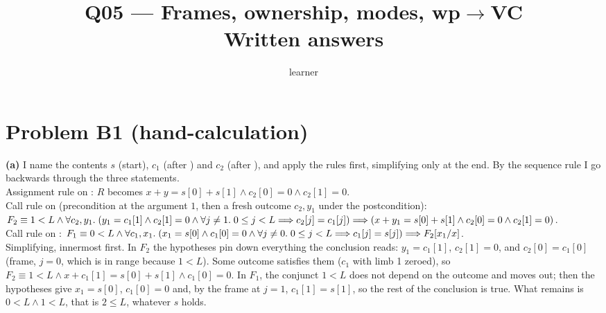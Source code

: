 \documentclass[11pt]{article}
\title{Q05 --- Frames, ownership, modes, wp$\to$VC \\ \large Written answers}
\author{learner}
\date{}
\begin{document}
\maketitle

\section*{Problem B1 (hand-calculation)}\label{ans:B1}
\begin{answer}
\textbf{(a)} I name the contents $s$ (start), $c_1$ (after
) and $c_2$ (after ), and apply the rules
first, simplifying only at the end. By the sequence rule I go backwards
through the three statements. \\
Assignment rule on : $R$ becomes $x + y = s[0] + s[1] \wedge
c_2[0] = 0 \wedge c_2[1] = 0$. \\
Call rule on  (precondition at the argument $1$, then a
fresh outcome $c_2, y_1$ under the postcondition):
$F_2 \equiv 1 < L \wedge \forall c_2, y_1 .\; (y_1 = c_1[1] \wedge c_2[1] = 0
\wedge \forall j \neq 1 .\; 0 \leq j < L \impl c_2[j] = c_1[j]) \impl (x + y_1
= s[0] + s[1] \wedge c_2[0] = 0 \wedge c_2[1] = 0)$. \\
Call rule on :
$F_1 \equiv 0 < L \wedge \forall c_1, x_1 .\; (x_1 = s[0] \wedge c_1[0] = 0
\wedge \forall j \neq 0 .\; 0 \leq j < L \impl c_1[j] = s[j]) \impl
\subst{F_2}{x}{x_1}$. \\
Simplifying, innermost first. In $F_2$ the hypotheses pin down everything the
conclusion reads: $y_1 = c_1[1]$, $c_2[1] = 0$, and $c_2[0] = c_1[0]$ (frame,
$j = 0$, which is in range because $1 < L$). Some outcome satisfies them
($c_1$ with limb 1 zeroed), so $F_2 \equiv 1 < L \wedge x + c_1[1] = s[0] +
s[1] \wedge c_1[0] = 0$. In $F_1$, the conjunct $1 < L$ does not depend on the
outcome and moves out; then the hypotheses give $x_1 = s[0]$, $c_1[0] = 0$
and, by the frame at $j = 1$, $c_1[1] = s[1]$, so the rest of the conclusion
is true. What remains is $0 < L \wedge 1 < L$, that is $2 \leq L$, whatever
$s$ holds.


\end{answer}
\end{document}
